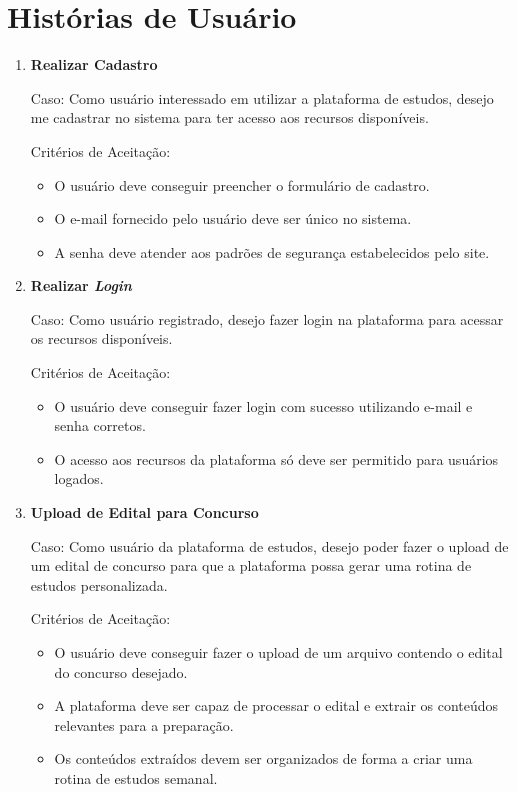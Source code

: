 \section{Histórias de Usuário} 

\begin{enumerate}[label=\textbf{\arabic*.}]
    
    \item \textbf{Realizar Cadastro} \newline
    
    Caso: Como usuário interessado em utilizar a plataforma de estudos, desejo me cadastrar no sistema para ter acesso aos recursos disponíveis.

    Critérios de Aceitação:
    \begin{itemize}
        \item O usuário deve conseguir preencher o formulário de cadastro.
        \item O e-mail fornecido pelo usuário deve ser único no sistema.
        \item A senha deve atender aos padrões de segurança estabelecidos pelo site.
    \end{itemize} 

    \newpage
    \item \textbf{Realizar \textit{Login}} \newline

    Caso: Como usuário registrado, desejo fazer login na plataforma para acessar os recursos disponíveis.

    Critérios de Aceitação:
    \begin{itemize}
        \item O usuário deve conseguir fazer login com sucesso utilizando e-mail e senha corretos.
        \item O acesso aos recursos da plataforma só deve ser permitido para usuários logados.
    \end{itemize}
    
    \item \textbf{Upload de Edital para Concurso} \newline
    
    Caso: Como usuário da plataforma de estudos, desejo poder fazer o upload de um edital de concurso para que a plataforma possa gerar uma rotina de estudos personalizada.

    Critérios de Aceitação:
    \begin{itemize}
        \item O usuário deve conseguir fazer o upload de um arquivo contendo o edital do concurso desejado.
        \item A plataforma deve ser capaz de processar o edital e extrair os conteúdos relevantes para a preparação.
        \item Os conteúdos extraídos devem ser organizados de forma a criar uma rotina de estudos semanal.
    \end{itemize}


\end{enumerate}
